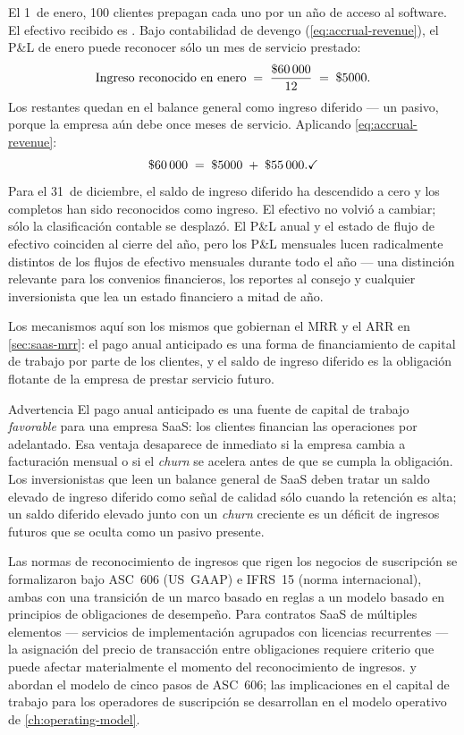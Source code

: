 \begin{example}
El 1~de enero, \num{100} clientes prepagan  cada uno por un año de acceso al software.
El efectivo recibido es . Bajo contabilidad de devengo (\cref{eq:accrual-revenue}),
el P\&L de enero puede reconocer sólo un mes de servicio prestado:
\[
  \text{Ingreso reconocido en enero} \;=\; \frac{\$\num{60000}}{12} \;=\; \$\num{5000}.
\]
Los  restantes quedan en el balance general como ingreso diferido --- un pasivo,
porque la empresa aún debe once meses de servicio. Aplicando \cref{eq:accrual-revenue}:
\[
  \$\num{60000} \;=\; \$\num{5000} \;+\; \$\num{55000}. \checkmark
\]
Para el 31~de diciembre, el saldo de ingreso diferido ha descendido a cero y los 
completos han sido reconocidos como ingreso. El efectivo no volvió a cambiar; sólo la clasificación
contable se desplazó. El P\&L anual y el estado de flujo de efectivo coinciden al cierre del año,
pero los P\&L mensuales lucen radicalmente distintos de los flujos de efectivo mensuales durante
todo el año --- una distinción relevante para los convenios financieros, los reportes al consejo y
cualquier inversionista que lea un estado financiero a mitad de año.

Los mecanismos aquí son los mismos que gobiernan el MRR y el ARR en \cref{sec:saas-mrr}: el pago
anual anticipado es una forma de financiamiento de capital de trabajo por parte de los clientes, y
el saldo de ingreso diferido es la obligación flotante de la empresa de prestar servicio futuro.
\end{example}

\begin{admonition}{Advertencia}
El pago anual anticipado es una fuente de capital de trabajo \emph{favorable} para una empresa SaaS:
los clientes financian las operaciones por adelantado. Esa ventaja desaparece de inmediato si la
empresa cambia a facturación mensual o si el \emph{churn} se acelera antes de que se cumpla la
obligación. Los inversionistas que leen un balance general de SaaS deben tratar un saldo elevado de
ingreso diferido como señal de calidad sólo cuando la retención es alta; un saldo diferido elevado
junto con un \emph{churn} creciente es un déficit de ingresos futuros que se oculta como un pasivo
presente.
\end{admonition}

Las normas de reconocimiento de ingresos que rigen los negocios de suscripción se formalizaron
bajo ASC~606 (US~GAAP) e IFRS~15 (norma internacional), ambas con una transición de un marco
basado en reglas a un modelo basado en principios de obligaciones de desempeño. Para contratos SaaS
de múltiples elementos --- servicios de implementación agrupados con licencias recurrentes ---
la asignación del precio de transacción entre obligaciones requiere criterio que puede afectar
materialmente el momento del reconocimiento de ingresos. \textcite{weygandt2019financial} y
\textcite{libby2022financial} abordan el modelo de cinco pasos de ASC~606; las implicaciones en el
capital de trabajo para los operadores de suscripción se desarrollan en el modelo operativo de
\cref{ch:operating-model}.

